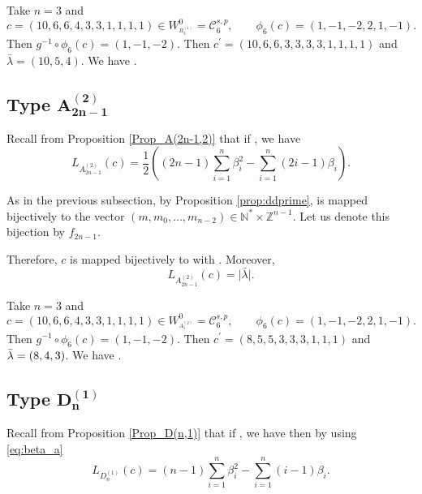 \documentclass[pdftex]{sigma}
\numberwithin{equation}{section}
\newcommand{\cC}{\mathcal{C}}
\newcommand{\Z}{\mathbb{Z}}
\newcommand{\N}{\mathbb{N}}
\begin{document}
\begin{Example}
	Take $n=3$ and
\[
c=(10,6,6,4,3,3,1,1,1,1)\in W_{^{B_{3}^{(1)}}}^{0}=\mathcal{C}_{6}^{s,p}, \qquad \phi_{6}(c)=(1,-1,-2,2,1,-1).
\]
 Then $g^{-1}\circ\phi_{6}(c)=(1,-1,-2)$. Then $c^{\prime }=(10,6,6,3,3,3,3,1,1,1,1)$ and $\bar{\lambda}=(10,5,4)$. We have .
\end{Example}

\subsection[Type A\_\{2n-1\}\^{}(2)]{Type $\boldsymbol{A_{2n-1}^{(2)}}$}

Recall from Proposition \ref{Prop_A(2n-1,2)} that if , we have
\begin{equation*}
L_{A_{2n-1}^{(2)}}(c)=\frac{1}{2} \left((2n-1)\sum_{i=1}^n\beta_i^2-\sum_{i=1}^n (2i-1)\beta_i\right).
\end{equation*}

As in the previous subsection, by Proposition \ref{prop:ddprime}, \smash{$\bar{
	\lambda}\in\cC_{2n-1}^{d,\mathrm{tr},r}$} is mapped bijectively to the vector
$(m,m_0,\dots,m_{n-2})\in\N^*\times \Z^{n-1}$. Let us denote this bijection
by $f_{2n-1}$.

Therefore, $c$ is mapped bijectively to \smash{$\bar{\lambda}\in\cC_{2n-1}^{d,%
	\mathrm{tr},r}$} with . Moreover,
\begin{equation*}
L_{A_{2n-1}^{(2)}}(c)=\bigl\lvert \bar{\lambda}\bigr\rvert.
\end{equation*}

\begin{Example}
	Take $n=3$ and
\[
c=(10,6,6,4,3,3,1,1,1,1)\in W_{^{A_{5}^{(2)}}}^{0}=\mathcal{C%
	}_{6}^{s,p}, \qquad \phi_{6}(c)=(1,-1,-2,2,1,-1).
\]
 Then $g^{-1}\circ%
	\phi_{6}(c)=(1,-1,-2)$. Then $c^{\prime }=(8,5,5,3,3,3,1,1,1)$ and $\bar{%
		\lambda}=(8,4,3)$. We have .
\end{Example}

\subsection[Type D\_n\^{}(1)]{Type $\boldsymbol{D_{n}^{(1)}}$}

Recall from Proposition \ref{Prop_D(n,1)} that if , we have then by using \eqref{eq:beta_a}
\begin{equation*}
L_{D_{n}^{(1)}}(c)=(n-1)\sum_{i=1}^{n}\beta
_{i}^{2}-\sum_{i=1}^{n}(i-1)\beta _{i}.
\end{equation*}
\end{document}
